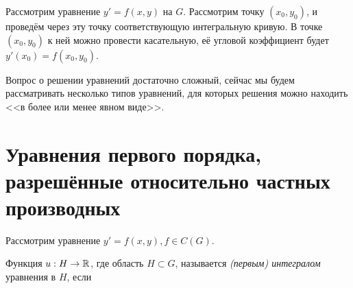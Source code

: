 \documentclass[a4paper]{report}
\begin{document}
    Рассмотрим уравнение $y' = f(x, y)$ на $G$.
    Рассмотрим точку $(x_0, y_0)$, и проведём через эту точку соответствующую интегральную кривую.
    В точке $(x_0, y_0)$ к ней можно провести касательную, её угловой коэффициент будет $y'(x_0) = f(x_0, y_0)$.

    Вопрос о решении уравнений достаточно сложный, сейчас мы будем рассматривать несколько типов уравнений, для которых решения можно находить <<в более или менее явном виде>>.


    \section{Уравнения первого порядка, разрешённые относительно частных производных}
    Рассмотрим уравнение $y' = f(x, y), f \in C(G)$.

    Функция $u: H \rightarrow \mathbb{R}$, где область $H \subset G$, называется \emph{(первым) интегралом} уравнения в $H$, если
\end{document}
